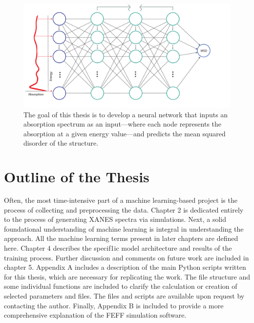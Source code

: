 \begin{figure}[h!]
    \centering
    \includegraphics[width=\linewidth]{Chapters/Figures/thesis-design.pdf}
    \caption[Project Approach]{The goal of this thesis is to develop a neural network that inputs an absorption spectrum as an input---where each node represents the absorption at a given energy value---and predicts the mean squared disorder of the structure.}
\end{figure}

\section{Outline of the Thesis}
Often, the most time-intensive part of a machine learning-based project is the process of collecting and preprocessing the data. Chapter 2 is dedicated entirely to the process of generating XANES spectra via simulations. Next, a solid foundational understanding of machine learning is integral in understanding the approach. All the machine learning terms present in later chapters are defined here.  Chapter 4 describes the specif1ic model architecture and results of the training process. Further discussion and comments on future work are included in chapter 5. Appendix A includes a description of the main Python scripts written for this thesis, which are necessary for replicating the work. The file structure and some individual functions are included to clarify the calculation or creation of selected parameters and files. The files and scripts are available upon request by contacting the author. Finally, Appendix B is included to provide a more comprehensive explanation of the FEFF simulation software.
